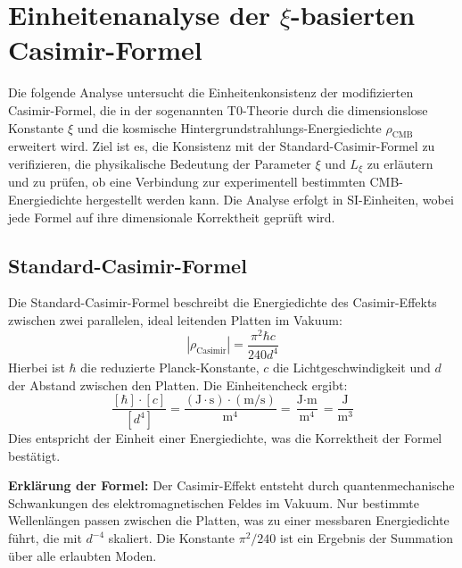 \documentclass{article}
\begin{document}
	
	\section{Einheitenanalyse der $\xi$-basierten Casimir-Formel}
	Die folgende Analyse untersucht die Einheitenkonsistenz der modifizierten Casimir-Formel, die in der sogenannten T0-Theorie durch die dimensionslose Konstante $\xi$ und die kosmische Hintergrundstrahlungs-Energiedichte $\rho_{\text{CMB}}$ erweitert wird. Ziel ist es, die Konsistenz mit der Standard-Casimir-Formel zu verifizieren, die physikalische Bedeutung der Parameter $\xi$ und $L_\xi$ zu erläutern und zu prüfen, ob eine Verbindung zur experimentell bestimmten CMB-Energiedichte hergestellt werden kann. Die Analyse erfolgt in SI-Einheiten, wobei jede Formel auf ihre dimensionale Korrektheit geprüft wird.
	
	\subsection{Standard-Casimir-Formel}
	Die Standard-Casimir-Formel beschreibt die Energiedichte des Casimir-Effekts zwischen zwei parallelen, ideal leitenden Platten im Vakuum:
	\begin{equation}
		|\rho_{\text{Casimir}}| = \frac{\pi^2 \hbar c}{240 d^4}
	\end{equation}
	Hierbei ist $\hbar$ die reduzierte Planck-Konstante, $c$ die Lichtgeschwindigkeit und $d$ der Abstand zwischen den Platten. Die Einheitencheck ergibt:
	\begin{equation}
		\frac{[\hbar] \cdot [c]}{[d^4]} = \frac{(\text{J} \cdot \text{s}) \cdot (\text{m}/\text{s})}{\text{m}^4} = \frac{\text{J} \cdot \text{m}}{\text{m}^4} = \frac{\text{J}}{\text{m}^3}
	\end{equation}
	Dies entspricht der Einheit einer Energiedichte, was die Korrektheit der Formel bestätigt.
	
	\textbf{Erklärung der Formel:} Der Casimir-Effekt entsteht durch quantenmechanische Schwankungen des elektromagnetischen Feldes im Vakuum. Nur bestimmte Wellenlängen passen zwischen die Platten, was zu einer messbaren Energiedichte führt, die mit $d^{-4}$ skaliert. Die Konstante $\pi^2/240$ ist ein Ergebnis der Summation über alle erlaubten Moden.
	
\end{document}
